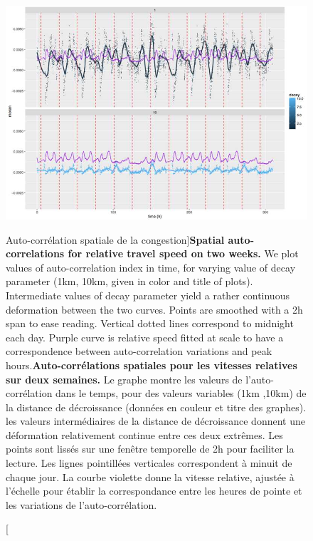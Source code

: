 \begin{figure}
\includegraphics[width=\linewidth]{Figures/Final/8-1-2-fig-transportationequilibrium-fig-5.jpg}
\caption[Spatial auto-correlation for congestion][Auto-corrélation spatiale de la congestion]{\textbf{Spatial auto-correlations for relative travel speed on two weeks.} We plot values of auto-correlation index in time, for varying value of decay parameter (1km, 10km, given in color and title of plots). Intermediate values of decay parameter yield a rather continuous deformation between the two curves. Points are smoothed with a 2h span to ease reading. Vertical dotted lines correspond to midnight each day. Purple curve is relative speed fitted at scale to have a correspondence between auto-correlation variations and peak hours.\label{fig:transportationequilibrium:fig-5}}{\textbf{Auto-corrélations spatiales pour les vitesses relatives sur deux semaines.} Le graphe montre les valeurs de l'auto-corrélation dans le temps, pour des valeurs variables (1km ,10km) de la distance de décroissance (données en couleur et titre des graphes). les valeurs intermédiaires de la distance de décroissance donnent une déformation relativement continue entre ces deux extrêmes. Les points sont lissés sur une fenêtre temporelle de 2h pour faciliter la lecture. Les lignes pointillées verticales correspondent à minuit de chaque jour. La courbe violette donne la vitesse relative, ajustée à l'échelle pour établir la correspondance entre les heures de pointe et les variations de l'auto-corrélation.\label{fig:transportationequilibrium:fig-5}}
\end{figure}







